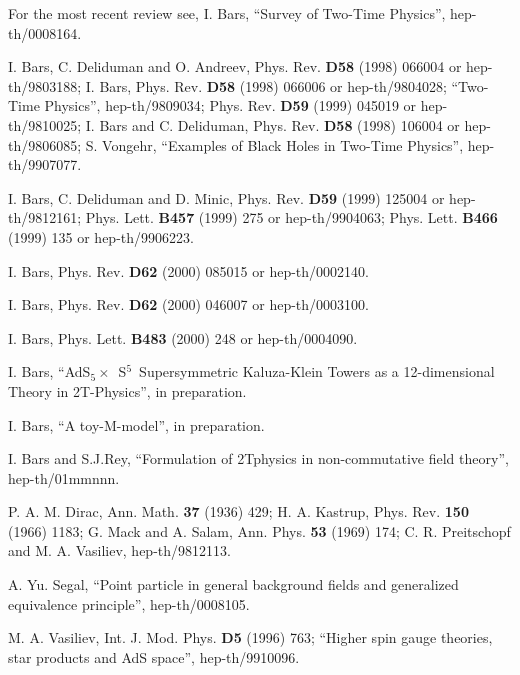 \documentclass[a4paper,12pt]{article}
\begin{document}
\begin{thebibliography}{99}
  For the most recent review see, I. Bars, ``Survey of
Two-Time Physics'', hep-th/0008164.

  I. Bars, C. Deliduman and O. Andreev, Phys. Rev. \textbf{D58}
(1998) 066004 or hep-th/9803188; \newline
I. Bars, Phys. Rev. \textbf{D58} (1998) 066006 or hep-th/9804028; ``Two-Time
Physics'', hep-th/9809034; Phys. Rev. \textbf{D59} (1999) 045019 or
hep-th/9810025; \newline
I. Bars and C. Deliduman, Phys. Rev. \textbf{D58} (1998) 106004 or
hep-th/9806085;\newline
S. Vongehr, ``Examples of Black Holes in Two-Time Physics'', hep-th/9907077.

  I. Bars, C. Deliduman and D. Minic, Phys. Rev. \textbf{D59%
} (1999) 125004 or hep-th/9812161; Phys. Lett. \textbf{B457} (1999) 275 or
hep-th/9904063; Phys. Lett. \textbf{B466} (1999) 135 or hep-th/9906223.

  I. Bars, Phys. Rev. \textbf{D62} (2000) 085015 or
hep-th/0002140.

  I. Bars, Phys. Rev. \textbf{D62} (2000) 046007 or
hep-th/0003100.

  I. Bars, Phys. Lett. \textbf{B483} (2000) 248 or
hep-th/0004090.

  I. Bars, ``AdS$_{5}\times $\ S$^{5}$\ Supersymmetric
Kaluza-Klein Towers as a 12-dimensional Theory in 2T-Physics'', in
preparation.

  I. Bars, ``A toy-M-model'', in preparation.

  I. Bars and S.J.Rey, ``Formulation of 2Tphysics in
non-commutative field theory'', hep-th/01mmnnn.

  P. A. M. Dirac, Ann. Math. \textbf{37} (1936) 429;\newline
H. A. Kastrup, Phys. Rev. \textbf{150} (1966) 1183; \newline
G. Mack and A. Salam, Ann. Phys. \textbf{53} (1969) 174; \newline
C. R. Preitschopf and M. A. Vasiliev, hep-th/9812113.

  A. Yu. Segal, ``Point particle in general background fields
and generalized equivalence principle'', hep-th/0008105.

  M. A. Vasiliev, Int. J. Mod. Phys. \textbf{D5 }(1996)
763; ``Higher spin gauge theories, star products and AdS space'',
hep-th/9910096.


\end{thebibliography}
\end{document}

